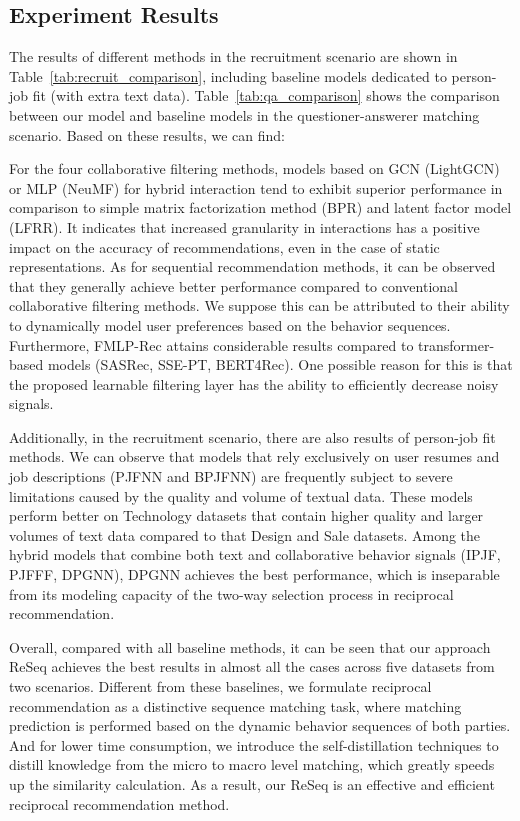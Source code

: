 \subsection{Experiment Results}
The results of different methods in the recruitment scenario are shown in Table~\ref{tab:recruit_comparison}, including baseline models dedicated to person-job fit (with extra text data). Table~\ref{tab:qa_comparison} shows the comparison between our model and baseline models in the questioner-answerer matching scenario. Based on these results, we can find:

For the four collaborative filtering methods, models based on GCN (\ie LightGCN) or MLP (\ie NeuMF) for hybrid interaction tend to exhibit superior performance in comparison to simple matrix factorization method (\ie BPR) and latent factor model (\ie LFRR). 
It indicates that increased granularity in interactions has a positive impact on the accuracy of recommendations, even in the case of static representations.
As for sequential recommendation methods, it can be observed that they generally achieve better performance compared to conventional collaborative filtering methods. We suppose this can be attributed to their ability to dynamically model user preferences based on the behavior sequences. 
Furthermore, FMLP-Rec attains considerable results compared to transformer-based models (\ie SASRec, SSE-PT, BERT4Rec). One possible reason for this is that the proposed learnable filtering layer has the ability to efficiently decrease noisy signals.

Additionally, in the recruitment scenario, there are also results of person-job fit methods. We can observe that models that rely exclusively on user resumes and job descriptions (\ie PJFNN and BPJFNN) are frequently subject to severe limitations caused by the quality and volume of textual data. 
These models perform better on Technology datasets that contain higher quality and larger volumes of text data compared to that Design and Sale datasets.
Among the hybrid models that combine both text and collaborative behavior signals (\ie IPJF, PJFFF, DPGNN), DPGNN achieves the best performance, which is inseparable from its modeling capacity of the two-way selection process in reciprocal recommendation.

Overall, compared with all baseline methods, it can be seen that our approach ReSeq achieves the best results in almost all the cases across five datasets from two scenarios. 
Different from these baselines, we formulate reciprocal recommendation as a distinctive sequence matching task, where matching prediction is performed based on the dynamic behavior sequences of both parties. 
And for lower time consumption, we introduce the self-distillation techniques to distill knowledge from the micro to macro level matching, which greatly speeds up the similarity calculation. As a result, our ReSeq is an effective and efficient reciprocal recommendation method.



